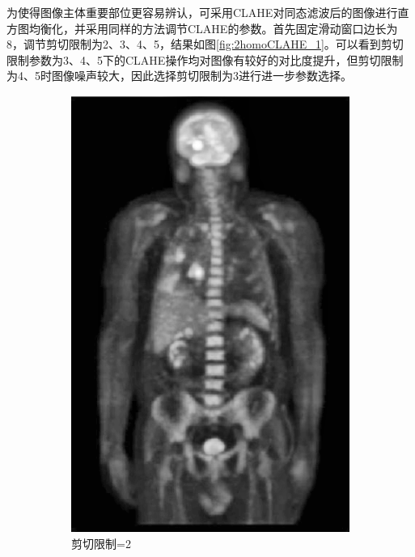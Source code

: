 \documentclass[a4paper]{ctexart}
\newcommand{\outwfour}{0.23\textwidth}
\begin{document}
\begin{spacing}{1.35}
	为使得图像主体重要部位更容易辨认，可采用CLAHE对同态滤波后的图像进行直方图均衡化\cite{RN159}，并采用同样的方法调节CLAHE的参数。首先固定滑动窗口边长为8，调节剪切限制为2、3、4、5，结果如图\ref{fig:2homoCLAHE_1}。可以看到剪切限制参数为3、4、5下的CLAHE操作均对图像有较好的对比度提升，但剪切限制为4、5时图像噪声较大，因此选择剪切限制为3进行进一步参数选择。
	\begin{figure}[htbp]
		\centering
		\begin{subfigure}[t]{\outwfour}
			\centering
			\includegraphics[width=\textwidth]{figure/2_clip_limit_2.png}
			\caption{剪切限制=2}
		\end{subfigure}
		\begin{subfigure}[t]{\outwfour}
			\centering

\end{subfigure}
\end{figure}
\end{spacing}
\end{document}
